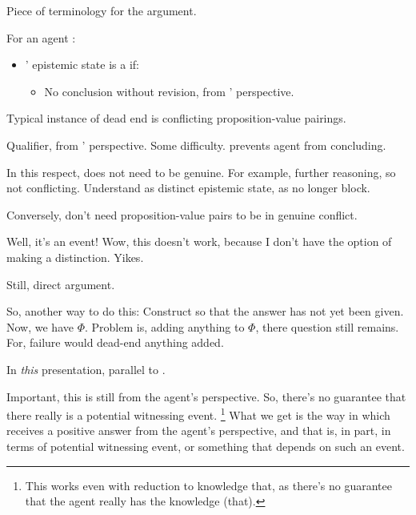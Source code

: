 \begin{note}[A \deadEnd{}]
  Piece of terminology for the argument.

  \begin{definition}[A \deadEnd{0}]
    \label{def:dead-end}
    For an agent \vAgent{}:

    \begin{itemize}
      \item
        \vAgent{}' epistemic state is a \emph{} if:
        \begin{itemize}
        \item
          No conclusion without revision, from \vAgent{}' perspective.
        \end{itemize}
      \end{itemize}
      \vspace{-\baselineskip}
    \end{definition}

    Typical instance of dead end is conflicting proposition-value pairings.

    Qualifier, from \vAgent{}' perspective.
    Some difficulty.
    \deadEnd{} prevents agent from concluding.

    In this respect, \deadEnd{} does not need to be genuine.
    For example, further reasoning, so not conflicting.
    Understand as distinct epistemic state, as no longer block.

    Conversely, don't need proposition-value pairs to be in genuine conflict.
\end{note}

\begin{note}
  \begin{argument}
    Well, it's an event!
    Wow, this doesn't work, because I don't have the option of making a distinction.
    Yikes.
  \end{argument}
  Still, direct argument.
  \begin{argument}
    {
      \color{green}
      So, another way to do this:
      Construct so that the answer has not yet been given.
      Now, we have \(\Phi\).
      Problem is, adding anything to \(\Phi\), there question still remains.
      For, failure would dead-end anything added.

      In \emph{this} presentation, parallel to \citeauthor{Carroll:1895uj}.
    }
  \end{argument}

  Important, this is still from the agent's perspective.
  So, there's no guarantee that there really is a potential witnessing event.%
  \footnote{
    This works even with reduction to knowledge that, as there's no guarantee that the agent really has the knowledge (that).
  }
  What we get is the way in which \qzS{} receives a positive answer from the agent's perspective, and that is, in part, in terms of potential witnessing event, or something that depends on such an event.
\end{note}

